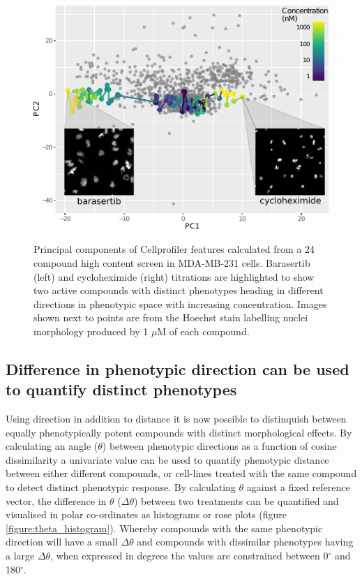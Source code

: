 \documentclass[a4paper,11pt,twoside,openright]{scrbook}
\begin{document}
\begin{figure}
    \captionsetup{width=0.8\textwidth}
    \caption[Two compound titrations highlighted in phenotypic space]{
Principal components of Cellprofiler features calculated from a 24 compound high content screen in MDA-MB-231 cells.
Barasertib (left) and cycloheximide (right) titrations are highlighted to show two active compounds with distinct phenotypes heading in different directions in phenotypic space with increasing concentration.
Images shown next to points are from the Hoechst stain labelling nuclei morphology produced by 1 $\mu$M of each compound.
}
    \includegraphics[scale=1.4]{figs/ch3TCCS_direction}
    \label{figure:pca_direction}
\end{figure}


\subsection{Difference in phenotypic direction can be used to quantify distinct phenotypes}

Using direction in addition to distance it is now possible to distinquish between equally phenotypically potent compounds with distinct morphological effects.
By calculating an angle ($\theta$) between phenotypic directions as a function of cosine dissimilarity a univariate value can be used to quantify phenotypic distance between either different compounds, or cell-lines treated with the same compound to detect distinct phenotypic response.
By calculating $\theta$ against a fixed reference vector, the difference in $\theta$  ($\Delta\theta$) between two treatments can be quantified and visualised in polar co-ordinates as histograms or rose plots (figure \ref{figure:theta_histogram}).
Whereby compounds with the same phenotypic direction will have a small $\Delta\theta$ and compounds with dissimilar phenotypes having a large $\Delta\theta$, when expressed in degrees the values are constrained between 0$^\circ$ and 180$^\circ$.
\end{document}
